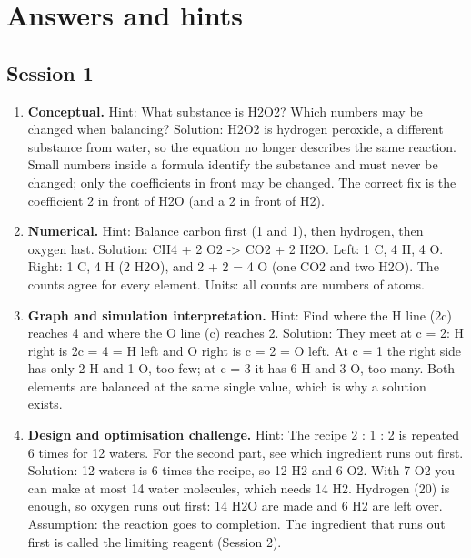 \documentclass[11pt,a4paper]{article}
\begin{document}
\section{Answers and hints}

\subsection*{Session 1}
\begin{enumerate}[nosep]
\item \textbf{Conceptual.} Hint: What substance is H2O2? Which numbers may be changed when balancing? Solution: H2O2 is hydrogen peroxide, a different substance from water, so the equation no longer describes the same reaction. Small numbers inside a formula identify the substance and must never be changed; only the coefficients in front may be changed. The correct fix is the coefficient 2 in front of H2O (and a 2 in front of H2).
\item \textbf{Numerical.} Hint: Balance carbon first (1 and 1), then hydrogen, then oxygen last. Solution: CH4 + 2 O2 -\textgreater{} CO2 + 2 H2O. Left: 1 C, 4 H, 4 O. Right: 1 C, 4 H (2 H2O), and 2 + 2 = 4 O (one CO2 and two H2O). The counts agree for every element. Units: all counts are numbers of atoms.
\item \textbf{Graph and simulation interpretation.} Hint: Find where the H line (2c) reaches 4 and where the O line (c) reaches 2. Solution: They meet at c = 2: H right is 2c = 4 = H left and O right is c = 2 = O left. At c = 1 the right side has only 2 H and 1 O, too few; at c = 3 it has 6 H and 3 O, too many. Both elements are balanced at the same single value, which is why a solution exists.
\item \textbf{Design and optimisation challenge.} Hint: The recipe 2 : 1 : 2 is repeated 6 times for 12 waters. For the second part, see which ingredient runs out first. Solution: 12 waters is 6 times the recipe, so 12 H2 and 6 O2. With 7 O2 you can make at most 14 water molecules, which needs 14 H2. Hydrogen (20) is enough, so oxygen runs out first: 14 H2O are made and 6 H2 are left over. Assumption: the reaction goes to completion. The ingredient that runs out first is called the limiting reagent (Session 2).
\end{enumerate}
\end{document}
